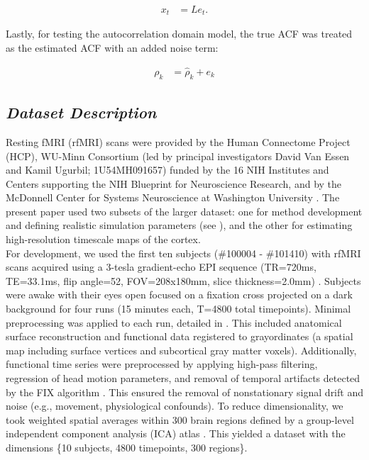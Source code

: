 \documentclass[main.tex]{subfiles}
\begin{document}
\begin{align}
    x_t &= L e_t.
\end{align}

\noindent Lastly, for testing the autocorrelation domain model, the true ACF was treated as the estimated ACF with an added noise term:

\begin{align}
    \rho_k &= \hat\rho_k + e_k
\end{align}

\subsection{\textit{Dataset Description}}\label{sec:dataset-description}

Resting fMRI (rfMRI) scans were provided by the Human Connectome Project (HCP), WU-Minn Consortium (led by principal investigators David Van Essen and Kamil Ugurbil; 1U54MH091657) funded by the 16 NIH Institutes and Centers supporting the NIH Blueprint for Neuroscience Research, and by the McDonnell Center for Systems Neuroscience at Washington University \citep{van_essen_wu-minn_2013}. The present paper used two subsets of the larger dataset: one for method development and defining realistic simulation parameters (see ), and the other for estimating high-resolution timescale maps of the cortex.\\

For development, we used the first ten subjects (\#100004 - \#101410) with rfMRI scans acquired using a 3-tesla gradient-echo EPI sequence (TR=720ms, TE=33.1ms, flip angle=52\textdegree, FOV=208x180mm, slice thickness=2.0mm) \citep{van_essen_wu-minn_2013}. Subjects were awake with their eyes open focused on a fixation cross projected on a dark background for four runs (15 minutes each, T=4800 total timepoints). Minimal preprocessing was applied to each run, detailed in \citep{glasser_minimal_2013}. This included anatomical surface reconstruction \citep{robinson_msm_2014} and functional data registered to grayordinates (a spatial map including surface vertices and subcortical gray matter voxels). Additionally, functional time series were preprocessed by applying high-pass filtering, regression of head motion parameters, and removal of temporal artifacts detected by the FIX algorithm \citep{salimi-khorshidi_automatic_2014}. This ensured the removal of nonstationary signal drift and noise (e.g., movement, physiological confounds). To reduce dimensionality, we took weighted spatial averages within 300 brain regions defined by a group-level independent component analysis (ICA) atlas \citep{smith_resting-state_2013}. This yielded a dataset with the dimensions \{10 subjects, 4800 timepoints, 300 regions\}.\\
\end{document}
